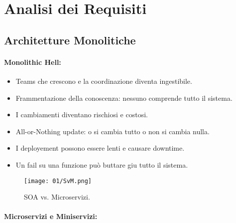 \section{Analisi dei Requisiti}

\subsection{Architetture Monolitiche}





\paragraph{Monolithic Hell:}

\begin{itemize}
	\item Teams che crescono e la coordinazione diventa ingestibile.
	\item Frammentazione della conoscenza: nessuno comprende tutto il sistema.
	\item I cambiamenti diventano rischiosi e costosi.
	\item All-or-Nothing update: o si cambia tutto o non si cambia nulla.
	\item I deployement possono essere lenti e causare downtime.
	\item Un fail su una funzione può buttare giu tutto il sistema.
\end{itemize}

\begin{figure}[h]
	\centering
	\texttt{[image: 01/SvM.png]}
	\caption{SOA vs. Microservizi.}
\end{figure}

\paragraph{Microservizi e Miniservizi:}

